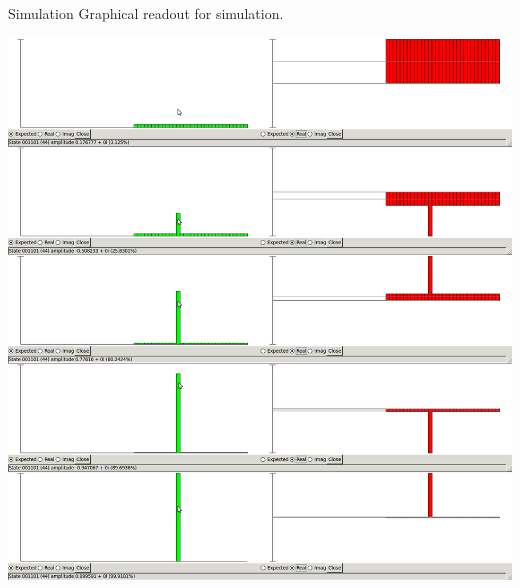 \documentclass{beamer}
\begin{document}
\begin{frame}{Simulation}
Graphical readout for simulation.
\begin{center}
\includegraphics[scale=0.11]{simulate}
\end{center}
\end{frame}
\end{document}
